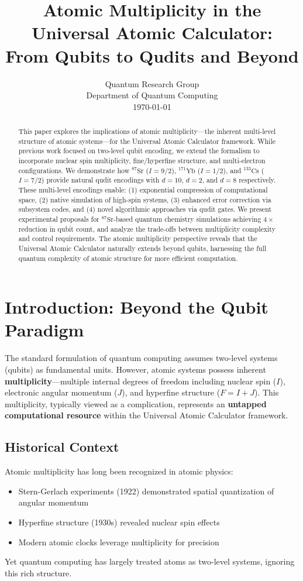 \documentclass[12pt,twocolumn]{article}
\title{Atomic Multiplicity in the Universal Atomic Calculator: \\
From Qubits to Qudits and Beyond}
\author{Quantum Research Group \\ Department of Quantum Computing \\ \today}
\date{}
\begin{document}
\maketitle

\begin{abstract}
This paper explores the implications of atomic multiplicity---the inherent multi-level structure of atomic systems---for the Universal Atomic Calculator framework. While previous work focused on two-level qubit encoding, we extend the formalism to incorporate nuclear spin multiplicity, fine/hyperfine structure, and multi-electron configurations. We demonstrate how $^{87}\text{Sr}$ ($I=9/2$), $^{171}\text{Yb}$ ($I=1/2$), and $^{133}\text{Cs}$ ($I=7/2$) provide natural qudit encodings with $d=10$, $d=2$, and $d=8$ respectively. These multi-level encodings enable: (1) exponential compression of computational space, (2) native simulation of high-spin systems, (3) enhanced error correction via subsystem codes, and (4) novel algorithmic approaches via qudit gates. We present experimental proposals for $^{87}\text{Sr}$-based quantum chemistry simulations achieving $4\times$ reduction in qubit count, and analyze the trade-offs between multiplicity complexity and control requirements. The atomic multiplicity perspective reveals that the Universal Atomic Calculator naturally extends beyond qubits, harnessing the full quantum complexity of atomic structure for more efficient computation.
\end{abstract}

\section{Introduction: Beyond the Qubit Paradigm}

The standard formulation of quantum computing assumes two-level systems (qubits) as fundamental units. However, atomic systems possess inherent \textbf{multiplicity}---multiple internal degrees of freedom including nuclear spin ($I$), electronic angular momentum ($J$), and hyperfine structure ($F = I + J$). This multiplicity, typically viewed as a complication, represents an \textbf{untapped computational resource} within the Universal Atomic Calculator framework.

\subsection{Historical Context}
Atomic multiplicity has long been recognized in atomic physics:
\begin{itemize}
\item Stern-Gerlach experiments (1922) demonstrated spatial quantization of angular momentum
\item Hyperfine structure (1930s) revealed nuclear spin effects
\item Modern atomic clocks leverage multiplicity for precision
\end{itemize}
Yet quantum computing has largely treated atoms as two-level systems, ignoring this rich structure.
\end{document}

